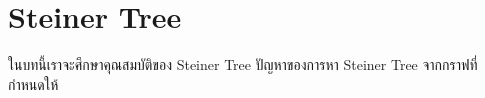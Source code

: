 \chapter{Steiner Tree}

\par{
ในบทนี้เราจะศึกษาคุณสมบัติของ Steiner Tree ปัญหาของการหา
Steiner Tree จากกราฟที่กำหนดให้ 
}
